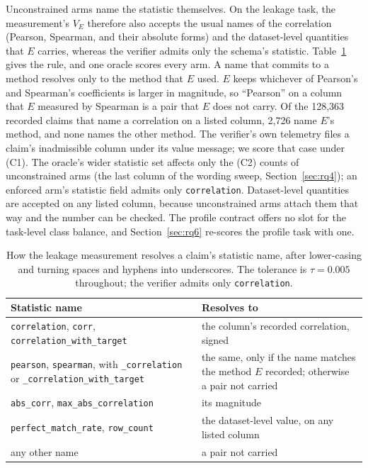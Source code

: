 \documentclass[journal]{IEEEtran}
\begin{document}
Unconstrained arms name the statistic themselves. On the leakage task, the
measurement's $V_E$ therefore also accepts the usual names of the correlation
(Pearson, Spearman, and their absolute forms) and the dataset-level quantities
that $E$ carries, whereas the verifier admits only the schema's statistic.
Table~\ref{tab:alias} gives the rule, and one oracle scores every arm. A name
that commits to a method resolves only to the method that $E$ used. $E$ keeps
whichever of Pearson's and Spearman's coefficients is larger in magnitude, so
``Pearson'' on a column that $E$ measured by Spearman is a pair that $E$ does
not carry. Of the 128{,}363 recorded claims that name a correlation on a listed
column, 2{,}726 name $E$'s method, and none names the other method. The
verifier's own telemetry files a claim's inadmissible column under its value
message; we score that case under (C1). The oracle's wider statistic set
affects only the (C2) counts of unconstrained arms (the last column of the
wording sweep, Section~\ref{sec:rq4}); an enforced arm's statistic field admits
only \texttt{correlation}. Dataset-level quantities are accepted on any listed
column, because unconstrained arms attach them that way and the number can be
checked. The profile contract offers no slot for the task-level class balance,
and Section~\ref{sec:rq6} re-scores the profile task with one.

\begin{table}[!htbp]
\caption{How the leakage measurement resolves a claim's statistic name, after
lower-casing and turning spaces and hyphens into underscores. The tolerance is
$\tau=0.005$ throughout; the verifier admits only \texttt{correlation}.}
\label{tab:alias}
\centering
\footnotesize
\setlength{\tabcolsep}{3pt}
\begin{tabular}{@{}p{3.9cm}p{4.4cm}@{}}
\toprule
Statistic name & Resolves to \\
\midrule
\texttt{correlation}, \texttt{corr}, \texttt{correlation\_with\_target} & the column's recorded correlation, signed \\
\texttt{pearson}, \texttt{spearman}, with \texttt{\_correlation} or \texttt{\_correlation\_with\_target} & the same, only if the name matches the method $E$ recorded; otherwise a pair not carried \\
\texttt{abs\_corr}, \texttt{max\_abs\_correlation} & its magnitude \\
\texttt{perfect\_match\_rate}, \texttt{row\_count} & the dataset-level value, on any listed column \\
any other name & a pair not carried \\
\bottomrule
\end{tabular}
\end{table}
\end{document}
